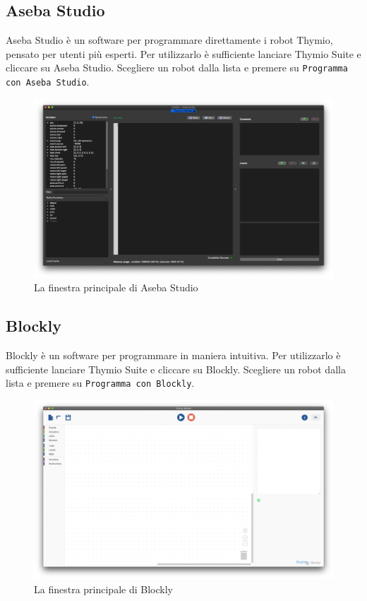 \documentclass[12pt]{article}
\begin{document}
	\newpage
		
	\subsection{Aseba Studio}
	
		Aseba Studio è un software per programmare direttamente i robot Thymio, pensato per utenti più esperti. Per utilizzarlo è sufficiente lanciare Thymio Suite e cliccare su Aseba Studio. Scegliere un robot dalla lista e premere su \texttt{Programma con Aseba Studio}.
		
		\begin{figure}[H]
			\includegraphics[width=\textwidth]{img/asebaStudio.png}
			\caption{La finestra principale di Aseba Studio}
			\label{main_aseba}
		\end{figure}		
		
	\newpage

	\subsection{Blockly}

		Blockly è un software per programmare in maniera intuitiva. Per utilizzarlo è sufficiente lanciare Thymio Suite e cliccare su Blockly. Scegliere un robot dalla lista e premere su \texttt{Programma con Blockly}.
		
		\begin{figure}[H]
			\includegraphics[width=\textwidth]{img/blockly.png}
			\caption{La finestra principale di Blockly}
			\label{main_blockly}
		\end{figure}
		
\end{document}
